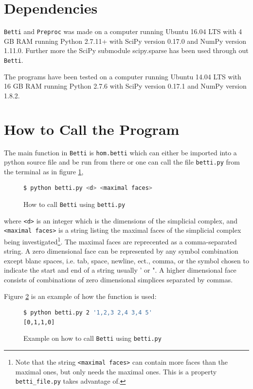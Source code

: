 \documentclass[11pt,a4paper,twoside]{report}
\begin{document}
\section{Dependencies}\label{ch:dependencies}
\texttt{Betti} and \texttt{Preproc} was made on a computer running Ubuntu 16.04 LTS with 4 GB RAM running Python 2.7.11+ with SciPy version 0.17.0 and NumPy version 1.11.0. Further more the SciPy submodule scipy.sparse has been used through out \texttt{Betti}.

The programs have been tested on a computer running Ubuntu 14.04 LTS with 16 GB RAM running Python 2.7.6 with SciPy version 0.17.1 and NumPy version 1.8.2.

\section{How to Call the Program} \label{ch:how2call}
The main function in \texttt{Betti} is \texttt{hom.betti} which can either be imported into a python source file and be run from there or one can call the file \texttt{betti.py} from the terminal as in figure \ref{fig:bettipseudo},
\begin{figure}[H]
\begin{lstlisting}[language=bash]
$ python betti.py <d> <maximal faces> 
\end{lstlisting}
\caption{How to call \texttt{Betti} using \texttt{betti.py}}
\label{fig:bettipseudo}
\end{figure}
where \texttt{<d>} is an integer which is the dimensions of the simplicial complex, and \texttt{<maximal faces>} is a string listing the maximal faces of the simplicial complex being investigated\footnote{Note that the string \texttt{<maximal faces>} can contain more faces than the maximal ones, but only needs the maximal ones. This is a property \texttt{betti\_file.py} takes advantage of.}. The maximal faces are reprecented as a comma-separated string. A zero dimensional face can be represented by any symbol combination except blanc spaces, i.e. tab, space, newline, ect., comma, or the symbol chosen to indicate the start and end of a string usually ' or ". A higher dimensional face consists of combinations of zero dimensional simplices separated by commas.

Figure \ref{fig:betti} is an example of how the function is used:
\begin{figure}[H]
\begin{lstlisting}[language=bash]
$ python betti.py 2 '1,2,3 2,4 3,4 5'
[0,1,1,0] 
\end{lstlisting}
\caption{Example on how to call \texttt{Betti} using \texttt{betti.py} }
\label{fig:betti}
\end{figure}
\end{document}
